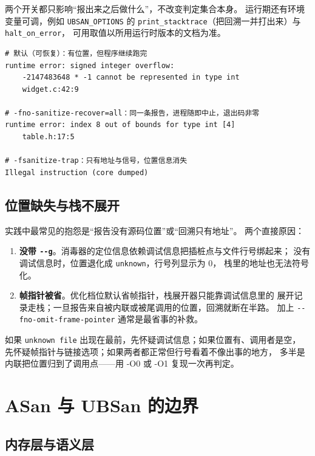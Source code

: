 \documentclass[12pt,a4paper,fontset=fandol]{ctexbook}
\newcommand{\Tp}[1]{\texttt{#1}}
\newcommand{\Opt}[1]{\texttt{-\/-#1}}
\newcommand{\Bk}{\discretionary{}{}{}}
\begin{document}
两个开关都只影响“报出来之后做什么”，不改变判定集合本身。
运行期还有环境变量可调，例如 \Tp{UBSAN\_OPTIONS} 的
\Tp{print\_stacktrace}（把回溯一并打出来）与 \Tp{halt\_on\_error}，
可用取值以所用运行时版本的文档为准。

\begin{lstlisting}[style=outstyle, caption={三种报告形状的差别（示意，非本仓库实测）}]
# 默认（可恢复）：有位置，但程序继续跑完
runtime error: signed integer overflow:
    -2147483648 * -1 cannot be represented in type int
    widget.c:42:9

# -fno-sanitize-recover=all：同一条报告，进程随即中止，退出码非零
runtime error: index 8 out of bounds for type int [4]
    table.h:17:5

# -fsanitize-trap：只有地址与信号，位置信息消失
Illegal instruction (core dumped)
\end{lstlisting}

\subsection{位置缺失与栈不展开}\label{sec:ub03-missing-location}

实践中最常见的抱怨是“报告没有源码位置”或“回溯只有地址”。
两个直接原因：

\begin{enumerate}
\item \textbf{没带 \Opt{g}}。消毒器的定位信息依赖调试信息把插桩点与文件行号绑起来；
      没有调试信息时，位置退化成 \Tp{unknown}，行号列显示为 0，
      栈里的地址也无法符号化。
\item \textbf{帧指针被省}。优化档位默认省帧指针，栈展开器只能靠调试信息里的
      展开记录走栈；一旦报告来自被内联或被尾调用的位置，回溯就断在半路。
      加上 \Opt{fno{\Bk}-omit{\Bk}-frame{\Bk}-pointer} 通常是最省事的补救。
\end{enumerate}

\begin{note}[title={位置缺失时先读这三行}]
如果 \Tp{unknown file} 出现在最前，先怀疑调试信息；如果位置有、调用者是空，
先怀疑帧指针与链接选项；如果两者都正常但行号看着不像出事的地方，
多半是内联把位置归到了调用点——用 -O0 或 -O1 复现一次再判定。
\end{note}

\section{ASan 与 UBSan 的边界}\label{sec:ub03-asan-ubsan}

\subsection{内存层与语义层}\label{sec:ub03-layers}
\end{document}
